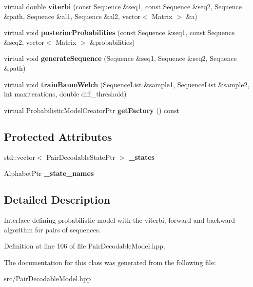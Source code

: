 \begin{DoxyCompactItemize}
virtual double {\bfseries viterbi} (const Sequence \&seq1, const Sequence \&seq2, Sequence \&path, Sequence \&al1, Sequence \&al2, vector$<$ Matrix $>$ \&a)
\item 
\mbox{\label{classtops_1_1PairDecodableModel_a8cb63bf6183bb505e7716a2de1b14319}} 
virtual void {\bfseries posterior\+Probabilities} (const Sequence \&seq1, const Sequence \&seq2, vector$<$ Matrix $>$ \&probabilities)
\item 
\mbox{\label{classtops_1_1PairDecodableModel_a0ac0b80316ebc9c0f149d021f85bf136}} 
virtual void {\bfseries generate\+Sequence} (Sequence \&seq1, Sequence \&seq2, Sequence \&path)
\item 
\mbox{\label{classtops_1_1PairDecodableModel_affe56c2870846451da360217aa50446f}} 
virtual void {\bfseries train\+Baum\+Welch} (Sequence\+List \&sample1, Sequence\+List \&sample2, int maxiterations, double diff\+\_\+threshold)
\item 
\mbox{\label{classtops_1_1PairDecodableModel_a7a21b47bbaa56dfd40c7320a255e2f35}} 
virtual Probabilistic\+Model\+Creator\+Ptr {\bfseries get\+Factory} () const
\end{DoxyCompactItemize}
\subsection*{Protected Attributes}
\begin{DoxyCompactItemize}
\item 
\mbox{\label{classtops_1_1PairDecodableModel_af776384230a00d80683b4eecaccd4194}} 
std\+::vector$<$ Pair\+Decodable\+State\+Ptr $>$ {\bfseries \+\_\+states}
\item 
\mbox{\label{classtops_1_1PairDecodableModel_aea4a28637c497db64c7c4c7c47f63376}} 
Alphabet\+Ptr {\bfseries \+\_\+state\+\_\+names}
\end{DoxyCompactItemize}


\subsection{Detailed Description}
Interface defining probabilistic model with the viterbi, forward and backward algorithm for pairs of sequences. 

Definition at line 106 of file Pair\+Decodable\+Model.\+hpp.



The documentation for this class was generated from the following file\+:\begin{DoxyCompactItemize}
\item 
src/Pair\+Decodable\+Model.\+hpp\end{DoxyCompactItemize}
